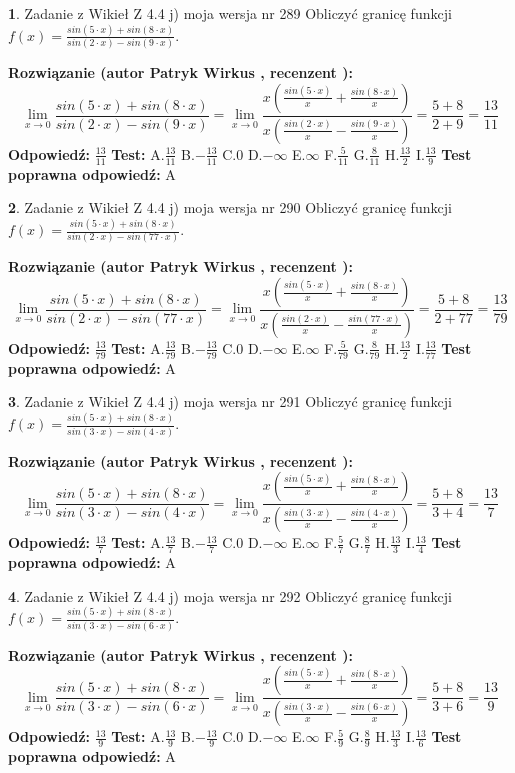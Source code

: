 \documentclass[12pt, a4paper]{article}
\theoremstyle{definition} %
\newtheorem{zad}{}
\newcommand{\zadStart}[1]{\begin{zad}#1\newline}
\newcommand{\zadStop}{\end{zad}}
\newcommand{\rozwStart}[2]{\noindent \textbf{Rozwiązanie (autor #1 , recenzent #2): }\newline}
\newcommand{\rozwStop}{\newline}
\newcommand{\odpStart}{\noindent \textbf{Odpowiedź:}\newline}
\newcommand{\odpStop}{\newline}
\newcommand{\testStart}{\noindent \textbf{Test:}\newline}
\newcommand{\testStop}{\newline}
\newcommand{\kluczStart}{\noindent \textbf{Test poprawna odpowiedź:}\newline}
\newcommand{\kluczStop}{\newline}
\begin{document}
\zadStart{Zadanie z Wikieł Z 4.4 j) moja wersja nr 289}
Obliczyć granicę funkcji $f(x)=\frac{sin(5\cdot x) +sin(8\cdot x)}{sin(2\cdot x) -sin(9\cdot x)}$.
\zadStop
\rozwStart{Patryk Wirkus}{}
$$\lim\limits_{x\to 0}\frac{sin(5\cdot x) +sin(8\cdot x)}{sin(2\cdot x) -sin(9\cdot x)}=\lim\limits_{x\to 0}\frac{x(\frac{sin(5\cdot x)}{x}+\frac{sin(8\cdot x)}{x})}{x(\frac{sin(2\cdot x)}{x}-\frac{sin(9\cdot x)}{x})}=\frac{5+8}{2+9} = \frac{13}{11}$$
\rozwStop
\odpStart
$\frac{13}{11}$
\odpStop
\testStart
A.$\frac{13}{11}$
B.$-\frac{13}{11}$
C.$0$
D.$-\infty$
E.$\infty$
F.$\frac{5}{11}$
G.$\frac{8}{11}$
H.$\frac{13}{2}$
I.$\frac{13}{9}$
\testStop
\kluczStart
A
\kluczStop



\zadStart{Zadanie z Wikieł Z 4.4 j) moja wersja nr 290}
Obliczyć granicę funkcji $f(x)=\frac{sin(5\cdot x) +sin(8\cdot x)}{sin(2\cdot x) -sin(77\cdot x)}$.
\zadStop
\rozwStart{Patryk Wirkus}{}
$$\lim\limits_{x\to 0}\frac{sin(5\cdot x) +sin(8\cdot x)}{sin(2\cdot x) -sin(77\cdot x)}=\lim\limits_{x\to 0}\frac{x(\frac{sin(5\cdot x)}{x}+\frac{sin(8\cdot x)}{x})}{x(\frac{sin(2\cdot x)}{x}-\frac{sin(77\cdot x)}{x})}=\frac{5+8}{2+77} = \frac{13}{79}$$
\rozwStop
\odpStart
$\frac{13}{79}$
\odpStop
\testStart
A.$\frac{13}{79}$
B.$-\frac{13}{79}$
C.$0$
D.$-\infty$
E.$\infty$
F.$\frac{5}{79}$
G.$\frac{8}{79}$
H.$\frac{13}{2}$
I.$\frac{13}{77}$
\testStop
\kluczStart
A
\kluczStop



\zadStart{Zadanie z Wikieł Z 4.4 j) moja wersja nr 291}
Obliczyć granicę funkcji $f(x)=\frac{sin(5\cdot x) +sin(8\cdot x)}{sin(3\cdot x) -sin(4\cdot x)}$.
\zadStop
\rozwStart{Patryk Wirkus}{}
$$\lim\limits_{x\to 0}\frac{sin(5\cdot x) +sin(8\cdot x)}{sin(3\cdot x) -sin(4\cdot x)}=\lim\limits_{x\to 0}\frac{x(\frac{sin(5\cdot x)}{x}+\frac{sin(8\cdot x)}{x})}{x(\frac{sin(3\cdot x)}{x}-\frac{sin(4\cdot x)}{x})}=\frac{5+8}{3+4} = \frac{13}{7}$$
\rozwStop
\odpStart
$\frac{13}{7}$
\odpStop
\testStart
A.$\frac{13}{7}$
B.$-\frac{13}{7}$
C.$0$
D.$-\infty$
E.$\infty$
F.$\frac{5}{7}$
G.$\frac{8}{7}$
H.$\frac{13}{3}$
I.$\frac{13}{4}$
\testStop
\kluczStart
A
\kluczStop



\zadStart{Zadanie z Wikieł Z 4.4 j) moja wersja nr 292}
Obliczyć granicę funkcji $f(x)=\frac{sin(5\cdot x) +sin(8\cdot x)}{sin(3\cdot x) -sin(6\cdot x)}$.
\zadStop
\rozwStart{Patryk Wirkus}{}
$$\lim\limits_{x\to 0}\frac{sin(5\cdot x) +sin(8\cdot x)}{sin(3\cdot x) -sin(6\cdot x)}=\lim\limits_{x\to 0}\frac{x(\frac{sin(5\cdot x)}{x}+\frac{sin(8\cdot x)}{x})}{x(\frac{sin(3\cdot x)}{x}-\frac{sin(6\cdot x)}{x})}=\frac{5+8}{3+6} = \frac{13}{9}$$
\rozwStop
\odpStart
$\frac{13}{9}$
\odpStop
\testStart
A.$\frac{13}{9}$
B.$-\frac{13}{9}$
C.$0$
D.$-\infty$
E.$\infty$
F.$\frac{5}{9}$
G.$\frac{8}{9}$
H.$\frac{13}{3}$
I.$\frac{13}{6}$
\testStop
\kluczStart
A
\kluczStop
\end{document}
